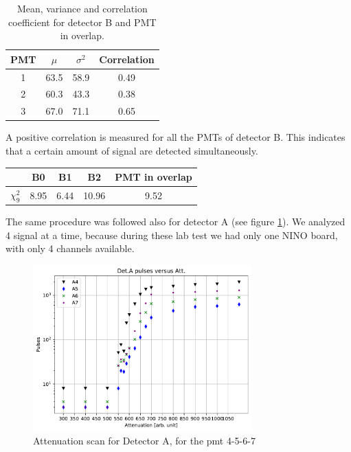 \begin{table}[ht]
\centering
\begin{tabular}{c|c|c|c}
\hline 
PMT & $\mu$ & $\sigma^{2}$ & Correlation \\
\hline
1 	& 63.5	& 58.9	& 0.49 \\
2 	& 60.3	& 43.3	& 0.38 \\
3	& 67.0	& 71.1  & 0.65 \\
\hline
\end{tabular}
\caption{Mean, variance and correlation coefficient for detector B and PMT in overlap.}
\label{tab:ResultBB}
\end{table}

A positive correlation is measured for all the PMTs of detector B. This indicates that a certain amount of signal are detected simultaneously.

\begingroup
\setlength{\tabcolsep}{8pt} %
\renewcommand{\arraystretch}{1.2} %
\begin{center}
\begin{tabular}{c|c|c|c|c}
\hline 
   & B0 & B1 & B2 & PMT in overlap \\ 
\hline
$\chi^{2}_{9}$ & 8.95 & 6.44 & 10.96 & 9.52\\ 
\hline
\end{tabular} 
\end{center}
\endgroup
\smallskip


The same procedure was followed also for detector A (see figure \ref{fig:ScatDetA}). We analyzed 4 signal at a time, because during these lab test we had only one NINO board, with only 4 channels available.

\begin{figure}[hbtp]
\centering
\includegraphics[width = 0.75\textwidth]{Analysis/AttenuationA(4-7).pdf}
\caption{Attenuation scan for Detector A, for the pmt 4-5-6-7}
\label{fig:ScatDetA}
\end{figure}

